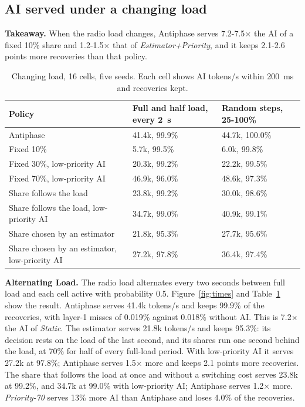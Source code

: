 \documentclass[acmsmall,screen,review,anonymous]{acmart}
\newcommand{\sys}{Antiphase\xspace}
\begin{document}
\subsection{AI served under a changing load}

\noindent\textbf{Takeaway.} When the radio load changes, \sys serves 7.2-7.5$\times$ the AI of a fixed 10\%
share and 1.2-1.5$\times$ that of \textit{Estimator+Priority}, and it keeps 2.1-2.6 points more
recoveries than that policy.

\begin{table}[t]
\caption{Changing load, 16 cells, five seeds. Each cell shows AI tokens/s within 200~ms and recoveries
kept.}
\label{tab:changing}
\footnotesize
\begin{tabular}{@{}lll@{}}
\toprule
Policy & Full and half load, every 2~s & Random steps, 25-100\% \\
\midrule
\sys & 41.4k, 99.9\% & 44.7k, 100.0\% \\
Fixed 10\% & 5.7k, 99.5\% & 6.0k, 99.8\% \\
Fixed 30\%, low-priority AI & 20.3k, 99.2\% & 22.2k, 99.5\% \\
Fixed 70\%, low-priority AI & 46.9k, 96.0\% & 48.6k, 97.3\% \\
Share follows the load & 23.8k, 99.2\% & 30.0k, 98.6\% \\
Share follows the load, low-priority AI & 34.7k, 99.0\% & 40.9k, 99.1\% \\
Share chosen by an estimator & 21.8k, 95.3\% & 27.7k, 95.6\% \\
Share chosen by an estimator, low-priority AI & 27.2k, 97.8\% & 36.4k, 97.4\% \\
\bottomrule
\end{tabular}
\end{table}

\noindent\textbf{Alternating Load.} The radio load alternates every two seconds between full load and each
cell active with probability 0.5. Figure~\ref{fig:times} and Table~\ref{tab:changing} show the result.
\sys serves 41.4k tokens/s and keeps 99.9\% of the recoveries, with layer-1 misses of 0.019\% against 0.018\%
without AI. This is 7.2$\times$ the AI of \textit{Static}. The estimator serves 21.8k tokens/s and keeps
95.3\%: its decision rests on the load of the last second, and its shares run one second behind the load,
at 70\% for half of every full-load period. With low-priority AI it serves 27.2k at 97.8\%; \sys serves
1.5$\times$ more and keeps 2.1 points more recoveries. The share that follows the load at once and without a
switching cost serves 23.8k at 99.2\%, and 34.7k at 99.0\% with low-priority AI; \sys serves 1.2$\times$ more.
\textit{Priority-70} serves 13\% more AI than \sys and loses 4.0\% of the recoveries.
\end{document}
